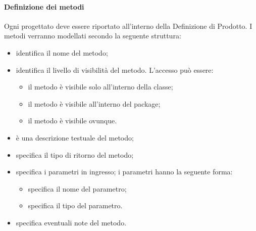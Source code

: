 \paragraph{Definizione dei metodi}
Ogni  progettato deve essere riportato all'interno della Definizione di Prodotto. I metodi verranno modellati secondo la seguente struttura:
\begin{itemize}
\item {}identifica il nome del metodo;
\item {}identifica il livello di visibilità del metodo. L'accesso può essere:
\begin{itemize}
\item {}il metodo è visibile solo all'interno della classe;
\item {}il metodo è visibile all'interno del package;
\item {}il metodo è visibile ovunque.
\end{itemize}
\item {}è una descrizione testuale del metodo;
\item {}specifica il tipo di ritorno del metodo;
\item {}specifica i parametri in ingresso; i parametri hanno la seguente forma:
\begin{itemize}
\item {}specifica il nome del parametro;
\item {}specifica il tipo del parametro.
\end{itemize}
\item {}specifica eventuali note del metodo.
\end{itemize}





